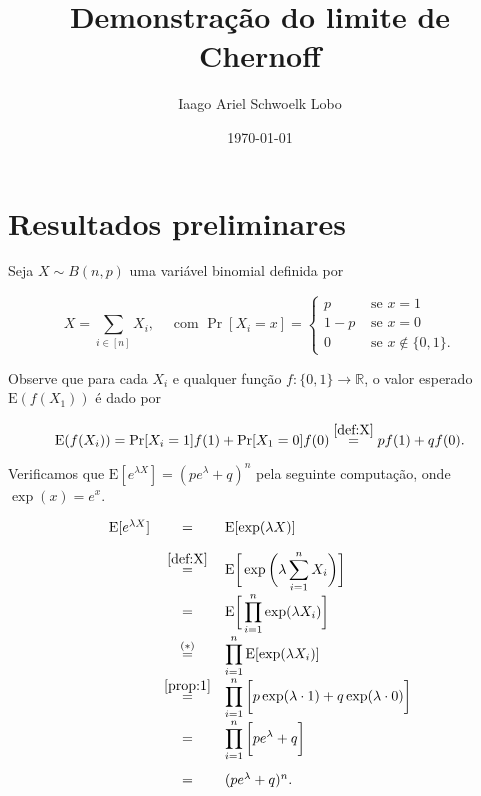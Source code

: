 \documentclass{article}
\title{Demonstração do limite de Chernoff}
\author{Iaago Ariel Schwoelk Lobo}
\date{\today}
\begin{document}
\maketitle

\section*{Resultados preliminares}

Seja \(X \sim B(n,p)\) uma variável binomial definida por

\begin{equation}\label{def:X}
	X = \displaystyle\sum_{i\in[n]}X_i,\quad\text{ com }
     \Pr[X_i = x]=\begin{cases}
        p&\text{ se }x = 1\\
        1-p&\text{ se }x = 0\\
        0&\text{ se }x\notin\{0,1\}.
    \end{cases}
\end{equation}

Observe que para cada \(X_i\) e qualquer função \(f:\{0,1\}\to\mathbb{R}\), o valor esperado \(\mathrm E (f(X_1))\) é dado por

\begin{equation}\label{prop:1}
	\mathrm E (f(X_i)) = \Pr[X_i = 1]f(1) + \Pr[X_1 = 0]f(0) \overset{\eqref{def:X}}{=} pf(1) + qf(0).
\end{equation}

Verificamos que \(\mathrm{E}[e^{\lambda X}] = (pe^{\lambda} + q)^n\) pela seguinte computação, onde \(\exp(x) = e^x\).

\begin{equation}
	\begin{array}{rcl}
		\mathrm{E}[e^{\lambda X}] & = & \mathrm{E}[\exp(\lambda X)]\\ [1em]
		& \overset{\eqref{def:X}}{=} & \mathrm E\bigg[\exp{\bigg(\lambda \displaystyle\sum_{i=1}^n X_i\bigg)}\bigg]\\[1em]
		& = & \mathrm E\bigg[\displaystyle\prod_{i=1}^n \exp(\lambda X_i)\bigg]\\[1em]
		& \overset{(*)}{=} & \displaystyle\prod_{i=1}^n \mathrm E[\exp(\lambda X_i)]\\[1em]
		& \overset{\eqref{prop:1}}{=} & \displaystyle\prod_{i=1}^n \bigg[p\exp(\lambda \cdot 1) + q \exp(\lambda \cdot 0)\bigg]\\[1em]
		& = & \displaystyle\prod_{i=1}^n \bigg[pe^\lambda + q\bigg]\\[1.75em]
		& = & (pe^\lambda + q)^n .
	\end{array}
\end{equation}
\end{document}
